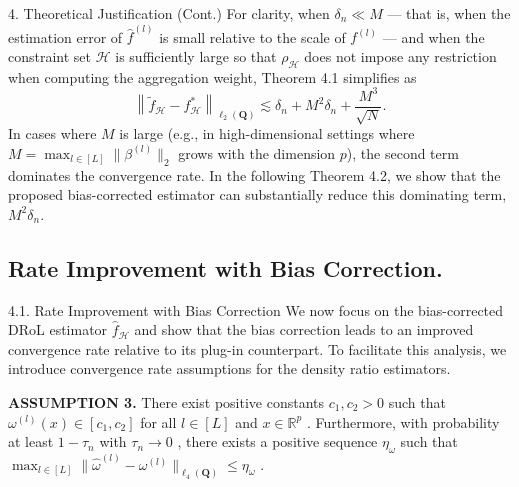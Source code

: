 \documentclass{beamer}
\begin{document}
\begin{frame}{4. Theoretical Justification (Cont.)}
    For clarity, when $\delta _ { n } \ll M$ — that is, when the estimation error of ${ \widehat { f } } ^ { ( l ) }$ is small relative to the scale of $f ^ { ( l ) }$ — and when the constraint set $\mathcal{H}$ is sufficiently large so that $\rho_{\mathcal{H}}$ does not impose any restriction when computing the aggregation weight, Theorem 4.1 simplifies as
    $$
    \left\| \widetilde {f} _ {\mathcal {H}} - f _ {\mathcal {H}} ^ {*} \right\| _ {\ell_ {2} (\mathbf {Q})} \lesssim \delta_ {n} + M ^ {2} \delta_ {n} + \frac {M ^ {3}}{\sqrt {N}}. 
    $$
    In cases where $M$ is large (e.g., in high-dimensional settings where $M = \operatorname* { m a x } _ { l \in [ L ] } \| \beta ^ { ( l ) } \| _ { 2 }$ grows with the dimension $p$), the second term dominates the convergence rate. In the following Theorem 4.2, we show that the proposed bias-corrected estimator can substantially reduce this dominating term, $M ^ { 2 } \delta _ { n }$.
\end{frame}

\subsection{Rate Improvement with Bias Correction.}

\begin{frame}{4.1. Rate Improvement with Bias Correction}
    We now focus on the bias-corrected DRoL estimator $\widehat { f } _ { \mathcal { H } }$ and show that the bias correction leads to an improved convergence rate relative to its plug-in counterpart. To facilitate this analysis, we introduce convergence rate assumptions for the density ratio estimators.
    
    \textbf{ASSUMPTION 3.} There exist positive constants $c _ { 1 } , c _ { 2 } > 0$ such that $\omega ^ { ( l ) } ( x ) \in [ c _ { 1 } , c _ { 2 } ]$ for all $l \in [ L ]$ and $x \in \mathbb { R } ^ { p }$ . Furthermore, with probability at least $1 - \tau _ { n }$ with $\tau _ { n } \to 0$ , there exists a positive sequence $\eta _ { \omega }$ such that $\max _ { l \in [ L ] } \| \widehat { \omega } ^ { ( l ) } - \omega ^ { ( l ) } \| _ { \ell _ { 4 } ( \mathbf { Q } ) } \leq \eta _ { \omega }$ .
\end{frame}
\end{document}
